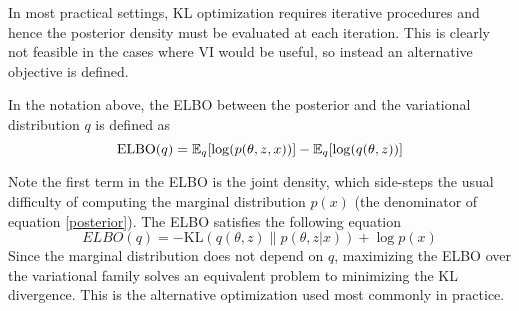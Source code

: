 In most practical settings, KL optimization requires iterative procedures and hence the posterior density must be evaluated at each iteration. This is clearly not feasible in the cases where VI would be useful, so instead an alternative objective is defined. 
\begin{definition}
	In the notation above, the ELBO between the posterior and the variational distribution $q$ is defined as
	\begin{equation*}
	\text{ELBO}(q) = \mathbb{E}_{q}[\log(p(\theta, z, x))] - \mathbb{E}_{q}[\log(q(\theta, z))]
	\end{equation*}
\end{definition}
Note the first term in the ELBO is the joint density, which side-steps the usual difficulty of computing the marginal distribution $p(x)$ (the denominator of equation \ref{posterior}). The ELBO satisfies the following equation
\begin{equation}
ELBO(q) = - \text{KL}(q(\theta, z) \| p(\theta, z |x)) + \log p(x)
\end{equation}
Since the marginal distribution does not depend on $q$, maximizing the ELBO over the variational family solves an equivalent problem to minimizing the KL divergence. This is the alternative optimization used most commonly in practice. 
